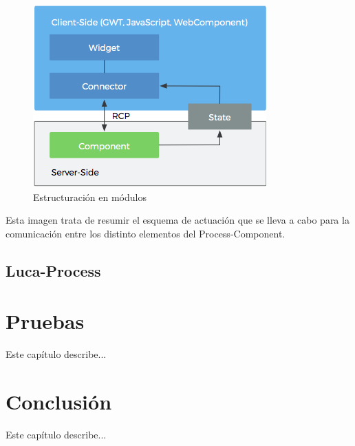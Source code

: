 \documentclass[a4paper,12pt]{book}
\begin{document}
	
		\begin{figure}[H]
			\centering
			\includegraphics[scale=1.25]{schema.png}
			\caption{Estructuración en módulos}\label{fig:schema}
		\end{figure}
	
		Esta imagen trata de  resumir el esquema de actuación que se lleva a cabo para la comunicación entre los distinto elementos del Process-Component.
		
		
		\section{Luca-Process}
	
	\afterpage{\null\newpage}
	\newpage
	
	
	\chapter{Pruebas}
	
	Este capítulo describe...
	
	\minitoc
	
	\afterpage{\null\newpage}
	\newpage
	
	
	
	\chapter{Conclusión}
	
	Este capítulo describe...
	
	\minitoc


	\clearpage
	
	
	
	
	\clearpage
\end{document}
